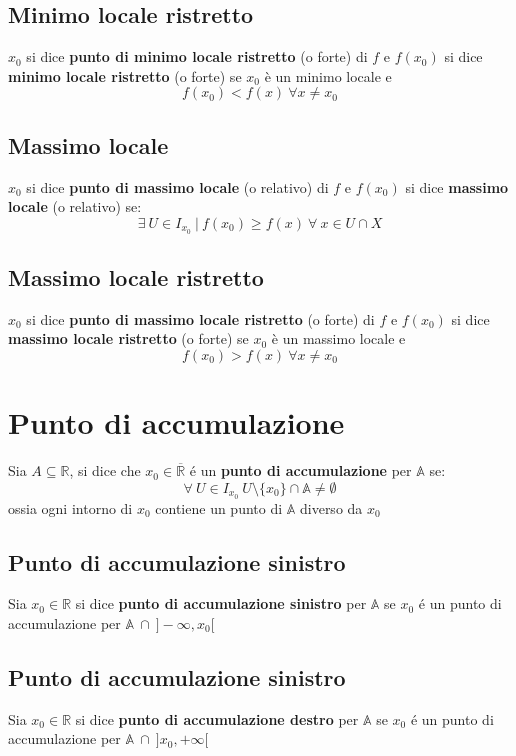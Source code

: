 \subsection{Minimo locale ristretto}
$x_0$ si dice \textbf{punto di minimo locale ristretto} (o forte) di $f$ e $f(x_0)$ si dice \textbf{minimo locale ristretto} (o forte) se $x_0$ è un minimo locale e
\begin{equation}
f(x_0)<f(x)\ \forall x \neq x_0
\end{equation}
\subsection{Massimo locale}
$x_0$ si dice \textbf{punto di massimo locale} (o relativo) di $f$ e $f(x_0)$ si dice \textbf{massimo locale} (o relativo) se:
\begin{equation}
\exists \ U \in I_{x_0}\ |\ f(x_0) \geq f(x)\ \forall\ x \in U \cap X
\end{equation}
\subsection{Massimo locale ristretto}
$x_0$ si dice \textbf{punto di massimo locale ristretto} (o forte) di $f$ e $f(x_0)$ si dice \textbf{massimo locale ristretto} (o forte) se $x_0$ è un massimo locale e
\begin{equation}
f(x_0)>f(x)\ \forall x \neq x_0
\end{equation}

\section{Punto di accumulazione}
Sia $A \subseteq \mathbb{R}$, si dice che $x_0 \in \overline{\mathbb{R}}$ \'e un \textbf{punto di accumulazione} per $\mathbb{A}$ se:
\begin{equation}
\forall\ U \in I_{x_0}\ U \setminus \{x_0\} \cap \mathbb{A} \neq \emptyset
\end{equation}
ossia ogni intorno di $x_0$ contiene un punto di $\mathbb{A}$ diverso da $x_0$
\subsection{Punto di accumulazione sinistro}
Sia $x_0 \in \mathbb{R}$ si dice \textbf{punto di accumulazione sinistro} per $\mathbb{A}$ se $x_0$ \'e un punto di accumulazione per $\mathbb{A}\ \cap\ ]-\infty,x_0[$
\subsection{Punto di accumulazione sinistro}
Sia $x_0 \in \mathbb{R}$ si dice \textbf{punto di accumulazione destro} per $\mathbb{A}$ se $x_0$ \'e un punto di accumulazione per $\mathbb{A}\ \cap\ ]x_0,+\infty[$
